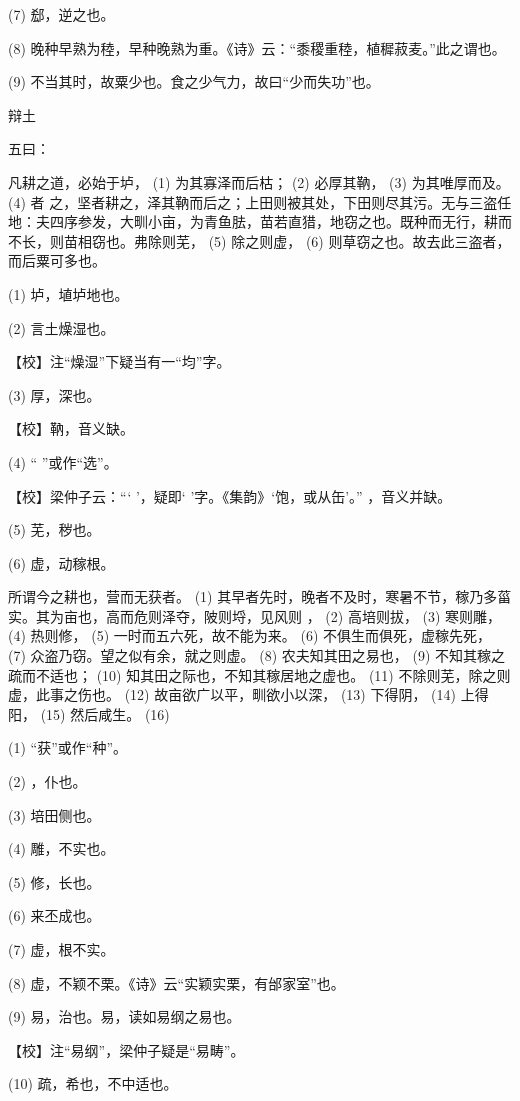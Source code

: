 \documentclass[12pt,UTF8]{ctexbook}
\begin{document}
(7) 郄，逆之也。

(8) 晚种早熟为稑，早种晚熟为重。《诗》云：“黍稷重稑，植穉菽麦。”此之谓也。

(9) 不当其时，故粟少也。食之少气力，故曰“少而失功”也。





辩土


五曰：

凡耕之道，必始于垆， (1) 为其寡泽而后枯； (2) 必厚其靹， (3) 为其唯厚而及。 (4) 者 之，坚者耕之，泽其靹而后之；上田则被其处，下田则尽其污。无与三盗任地：夫四序参发，大甽小亩，为青鱼胠，苗若直猎，地窃之也。既种而无行，耕而不长，则苗相窃也。弗除则芜， (5) 除之则虚， (6) 则草窃之也。故去此三盗者，而后粟可多也。

(1) 垆，埴垆地也。

(2) 言土燥湿也。

【校】注“燥湿”下疑当有一“均”字。

(3) 厚，深也。

【校】靹，音义缺。

(4) “ ”或作“选”。

【校】梁仲子云：“‘ ’，疑即‘ ’字。《集韵》‘饱，或从缶’。” ，音义并缺。

(5) 芜，秽也。

(6) 虚，动稼根。

所谓今之耕也，营而无获者。 (1) 其早者先时，晚者不及时，寒暑不节，稼乃多菑实。其为亩也，高而危则泽夺，陂则埒，见风则 ， (2) 高培则拔， (3) 寒则雕， (4) 热则修， (5) 一时而五六死，故不能为来。 (6) 不俱生而俱死，虚稼先死， (7) 众盗乃窃。望之似有余，就之则虚。 (8) 农夫知其田之易也， (9) 不知其稼之疏而不适也； (10) 知其田之际也，不知其稼居地之虚也。 (11) 不除则芜，除之则虚，此事之伤也。 (12) 故亩欲广以平，甽欲小以深， (13) 下得阴， (14) 上得阳， (15) 然后咸生。 (16)

(1) “获”或作“种”。

(2) ，仆也。

(3) 培田侧也。

(4) 雕，不实也。

(5) 修，长也。

(6) 来丕成也。

(7) 虚，根不实。

(8) 虚，不颖不栗。《诗》云“实颖实栗，有邰家室”也。

(9) 易，治也。易，读如易纲之易也。

【校】注“易纲”，梁仲子疑是“易畴”。

(10) 疏，希也，不中适也。
\end{document}
